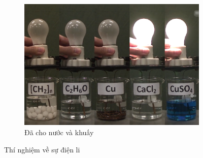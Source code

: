 \begin{figure}[!htp]
\begin{hopdongian}[\mauphu]
\begin{center}
\begin{subfigure}[b]{0.23\textwidth}
				\includegraphics[height=0.7\textwidth]{Images/anhhoa11/dodandien_4.png}
				\caption{Đã cho nước và khuấy}
				\label{subfig:TNsudienli4}
			\end{subfigure}
			\caption{Thí nghiệm về sự điện li}
			\label{fig:TNsudienli}
		\end{center}
	\end{hopdongian}
\end{figure}
